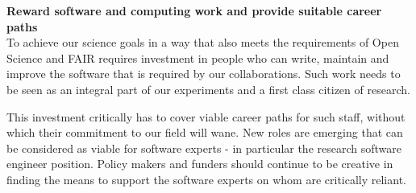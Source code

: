 {\bf Reward software and computing work and provide suitable career paths}\\

To achieve our science goals in a way that also meets the requirements of Open Science and FAIR requires investment in people who can write, maintain and improve the software that is required by our collaborations. Such work needs to be seen as an integral part of our experiments and a first class citizen of research.

This investment critically has to cover viable career paths for such staff, without which their commitment to our field will wane. New roles are emerging that can be considered as viable for software experts - in particular the research software engineer position. Policy makers and funders should continue to be creative in finding the means to support the software experts on whom are critically reliant.




















